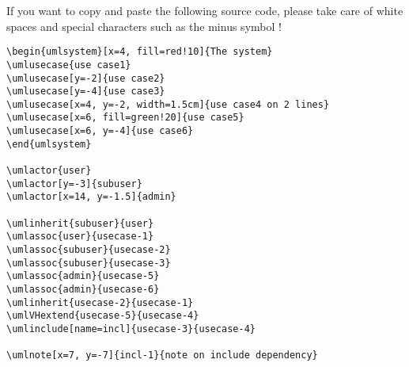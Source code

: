 \documentclass[a4paper,11pt, svgnames]{article}
\date{}
\title{}
\author{}
\begin{document}
\maketitle

If you want to copy and paste the following source code, please take care of white spaces and special characters such as the minus symbol !

\medskip
\lstset{breaklines=true, frame=trBL, language=tikzuml}
\begin{lstlisting}
\begin{umlsystem}[x=4, fill=red!10]{The system}
\umlusecase{use case1}
\umlusecase[y=-2]{use case2}
\umlusecase[y=-4]{use case3}
\umlusecase[x=4, y=-2, width=1.5cm]{use case4 on 2 lines}
\umlusecase[x=6, fill=green!20]{use case5}
\umlusecase[x=6, y=-4]{use case6}
\end{umlsystem}

\umlactor{user}
\umlactor[y=-3]{subuser}
\umlactor[x=14, y=-1.5]{admin}

\umlinherit{subuser}{user}
\umlassoc{user}{usecase-1}
\umlassoc{subuser}{usecase-2}
\umlassoc{subuser}{usecase-3}
\umlassoc{admin}{usecase-5}
\umlassoc{admin}{usecase-6}
\umlinherit{usecase-2}{usecase-1}
\umlVHextend{usecase-5}{usecase-4}
\umlinclude[name=incl]{usecase-3}{usecase-4}

\umlnote[x=7, y=-7]{incl-1}{note on include dependency}
\end{lstlisting}

\begin{center}
\end{center}
\end{document}
